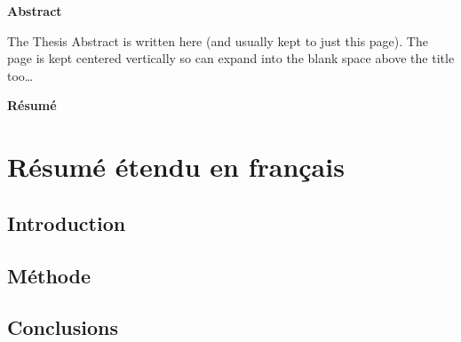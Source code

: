 
\openchapter
\checktoopen
{}
\begin{center}
\textbf{Abstract}
\end{center}
The Thesis Abstract is written here (and usually kept to just this page). The page is kept centered vertically so can expand into the blank space above the title too\ldots



\openchapter
\checktoopen
{}
\begin{center}
\textbf{Résumé}
\end{center}



\openchapter
\checktoopen
\setcounter{chapter}{1}
\chapter{Résumé étendu en français}
\section{Introduction}
\section{Méthode}
\section{Conclusions}
